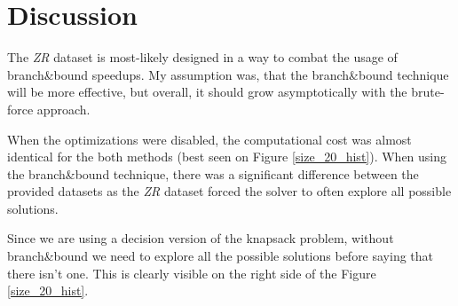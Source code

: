 \documentclass[a4paper,10pt]{article}
\begin{document}
\section{Discussion}
The \emph{ZR} dataset is most-likely designed in a way to combat the usage of branch\&bound speedups. My assumption was, that the branch\&bound technique will be more effective, but overall, it should grow asymptotically with the brute-force approach. 

When the optimizations were disabled, the computational cost was almost identical for the both methods (best seen on Figure \ref{size_20_hist}). When using the branch\&bound technique, there was a significant difference between the provided datasets as the \emph{ZR} dataset forced the solver to often explore all possible solutions.

Since we are using a decision version of the knapsack problem, without branch\&bound we need to explore all the possible solutions before saying that there isn't one. This is clearly visible on the right side of the Figure \ref{size_20_hist}.
\end{document}
